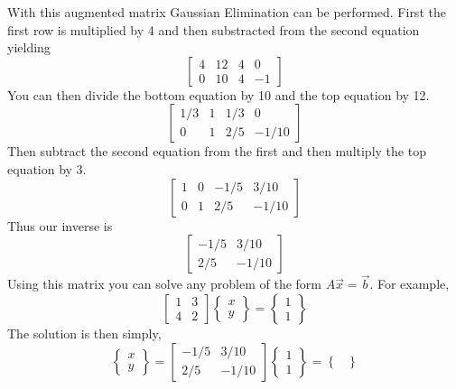 \begin{enumerate}
With this augmented matrix Gaussian Elimination can be
performed. First the first row is multiplied by 4 and then substracted
from the second equation yielding
\begin{equation}
\begin{bmatrix}
4 & 12 & 4 & 0\\
0 & 10 & 4 & -1
\end{bmatrix}
\end{equation}
You can then divide the bottom equation by 10 and the top equation by
12.
\begin{equation}
\begin{bmatrix}
1/3 & 1 & 1/3 & 0\\
0 & 1 & 2/5 & -1/10
\end{bmatrix}
\end{equation}
Then subtract the second equation from the first and then multiply the
top equation by 3.
\begin{equation}
\begin{bmatrix}
1 & 0 & -1/5 & 3/10\\
0 & 1 & 2/5 & -1/10
\end{bmatrix}
\end{equation}
Thus our inverse is 
\begin{equation}
\begin{bmatrix}
-1/5 & 3/10\\
2/5 & -1/10
\end{bmatrix}
\end{equation}
Using this matrix you can solve any problem of the form
$A\vec{x}=\vec{b}$. For example,
\begin{equation}
\begin{bmatrix}
1 & 3  \\
4 & 2
\end{bmatrix}\begin{Bmatrix} x \\ y \end{Bmatrix} = \begin{Bmatrix} 1 
  \\ 1 \end{Bmatrix}
\end{equation}
The solution is then simply,
\begin{equation}
\begin{Bmatrix} x \\ y \end{Bmatrix} = \begin{bmatrix}
-1/5 & 3/10  \\
2/5 & -1/10
\end{bmatrix} \begin{Bmatrix} 1 \\ 1 \end{Bmatrix} = \begin{Bmatrix}

\end{Bmatrix}
\end{equation}
\end{enumerate}
